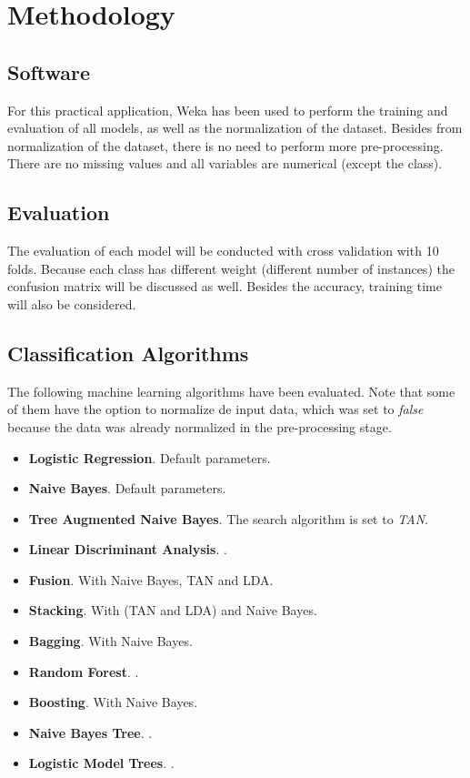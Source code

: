 \documentclass[a4paper,11pt]{article}
\begin{document}
\section{Methodology}
\label{sec:methodology}

\subsection{Software}
\label{subsec:software}

For this practical application, Weka \cite{weka} has been used to perform the training and evaluation of all models, as well as the normalization of the dataset. Besides from normalization of the dataset, there is no need to perform more pre-processing. There are no missing values and all variables are numerical (except the class).

\subsection{Evaluation}
\label{subsec:evaluation}

The evaluation of each model will be conducted with cross validation with 10 folds. Because each class has different weight (different number of instances) the confusion matrix will be discussed as well. Besides the accuracy, training time will also be considered.

\subsection{Classification Algorithms}
\label{subsec:algorithms}

The following machine learning algorithms have been evaluated. Note that some of them have the option to normalize de input data, which was set to \textit{false} because the data was already normalized in the pre-processing stage.

\begin{itemize}
\item \textbf{Logistic Regression}. Default parameters.
\item \textbf{Naive Bayes}. Default parameters.
\item \textbf{Tree Augmented Naive Bayes}. The search algorithm is set to \textit{TAN}.
\item \textbf{Linear Discriminant Analysis}. .
\item \textbf{Fusion}. With Naive Bayes, TAN and LDA.
\item \textbf{Stacking}. With (TAN and LDA) and Naive Bayes.
\item \textbf{Bagging}. With Naive Bayes.
\item \textbf{Random Forest}. .
\item \textbf{Boosting}. With Naive Bayes.
\item \textbf{Naive Bayes Tree}. .
\item \textbf{Logistic Model Trees}. .
\end{itemize}
\end{document}
